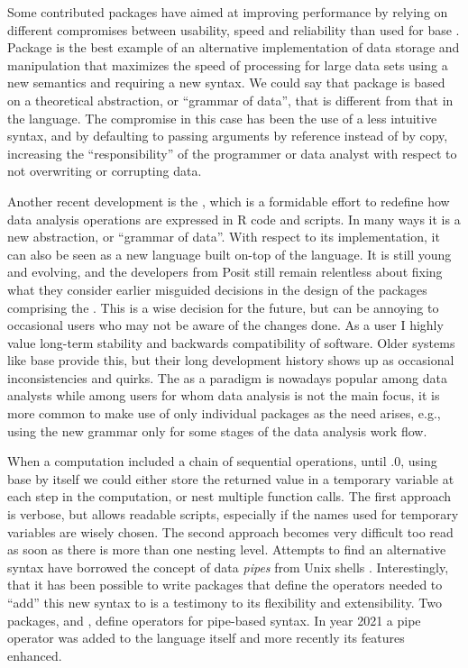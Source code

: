 \documentclass[krantz2]{krantz}\usepackage{knitr}
\begin{document}
Some contributed packages have aimed at improving performance by relying on different compromises between usability, speed and reliability than used for base \Rlang.
Package  is the best example of an alternative implementation of data storage and manipulation that maximizes the speed of processing for large data sets using a new semantics and requiring a new syntax. We could say that package  is based on a theoretical abstraction, or ``grammar of data'', that is different from that in the \Rlang language. The compromise in this case has been the use of a less intuitive syntax, and by defaulting to passing arguments by reference instead of by copy, increasing the ``responsibility'' of the programmer or data analyst with respect to not overwriting or corrupting data.

Another recent development is the , which is a formidable effort to redefine how data analysis operations are expressed in R code and scripts. In many ways it is a new abstraction, or ``grammar of data''. With respect to its implementation, it can also be seen as a new language built on-top of the \Rlang language. It is still young and evolving, and the developers from Posit still remain relentless about fixing what they consider earlier misguided decisions in the design of the packages comprising the . This is a wise decision for the future, but can be annoying to occasional users who may not be aware of the changes done. As a user I highly value long-term stability and backwards compatibility of software. Older systems like base \Rlang provide this, but their long development history shows up as occasional inconsistencies and quirks. The  as a paradigm is nowadays popular among data analysts while among users for whom data analysis is not the main focus, it is more common to make use of only individual packages as the need arises, e.g., using the new grammar only for some stages of the data analysis work flow.

When a computation included a chain of sequential operations, until .0, using base \Rlang by itself we could either store the returned value in a temporary variable at each step in the computation, or nest multiple function calls. The first approach is verbose, but allows readable scripts, especially if the names used for temporary variables are wisely chosen. The second approach becomes very difficult too read as soon as there is more than one nesting level. Attempts to find an alternative syntax have borrowed the concept of data \emph{pipes} from Unix shells \autocite{Kernigham1981}. Interestingly, that it has been possible to write packages that define the operators needed to ``add'' this new syntax to \Rlang is a testimony to its flexibility and extensibility. Two packages,  and , define operators for pipe-based syntax. In year 2021 a pipe operator was added to the \Rlang language itself and more recently its features enhanced.
\end{document}
